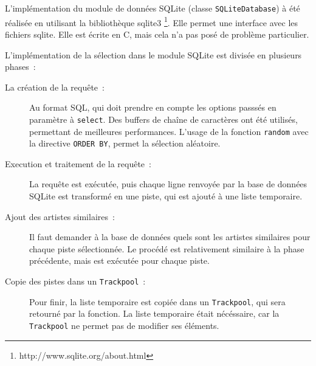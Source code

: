 L’implémentation du module de données SQLite (classe \texttt{SQLiteDatabase})
à été réalisée en utilisant la bibliothèque sqlite3
\footnote{http://www.sqlite.org/about.html}. Elle permet une interface avec les
fichiers sqlite. Elle est écrite en C, mais cela n'a pas posé de problème
particulier.

L’implémentation de la sélection dans le module SQLite est divisée en plusieurs
phases~:
\begin{description}
  \item[La création de la requête~:] Au format SQL, qui doit prendre en compte
  les options passsés en paramètre à \texttt{select}. Des buffers de chaîne de
  caractères ont été utilisés, permettant de meilleures performances. L'usage de
  la fonction \texttt{random} avec la directive \texttt{ORDER BY}, permet la
  sélection aléatoire.

  \item[Execution et traitement de la requête~:] La requête est exécutée, puis
  chaque ligne renvoyée par la base de données SQLite est transformé en une
  piste, qui est ajouté à une liste temporaire.

  \item[Ajout des artistes similaires~:] Il faut demander à la base de données
  quels sont les artistes similaires pour chaque piste sélectionnée. Le procédé
  est relativement similaire à la phase précédente, mais est exécutée pour
  chaque piste.

  \item[Copie des pistes dans un \texttt{Trackpool}~:] Pour finir, la liste
  temporaire est copiée dans un \texttt{Trackpool}, qui sera retourné par la
  fonction. La liste temporaire était nécéssaire, car la \texttt{Trackpool} ne
  permet pas de modifier ses éléments.
\end{description}
